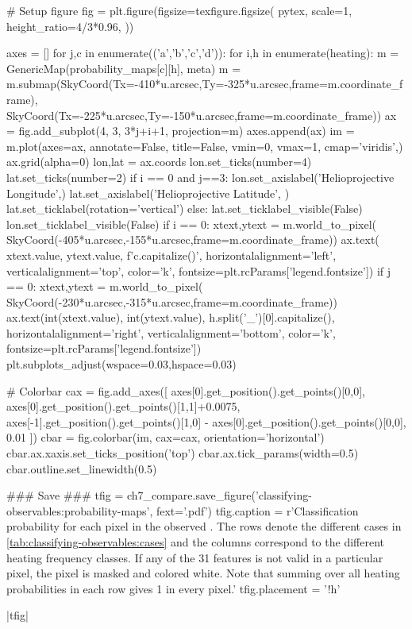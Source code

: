 \begin{pycode}
# Setup figure
fig = plt.figure(figsize=texfigure.figsize(
    pytex,
    scale=1,
    height_ratio=4/3*0.96,
))

axes = []
for j,c in enumerate(('a','b','c','d')):
    for i,h in enumerate(heating):
        m = GenericMap(probability_maps[c][h], meta)
        m = m.submap(SkyCoord(Tx=-410*u.arcsec,Ty=-325*u.arcsec,frame=m.coordinate_frame),
                     SkyCoord(Tx=-225*u.arcsec,Ty=-150*u.arcsec,frame=m.coordinate_frame))
        ax = fig.add_subplot(4, 3, 3*j+i+1, projection=m)
        axes.append(ax)
        im = m.plot(axes=ax, annotate=False, title=False, vmin=0, vmax=1, cmap='viridis',)
        ax.grid(alpha=0)
        lon,lat = ax.coords
        lon.set_ticks(number=4)
        lat.set_ticks(number=2)
        if i == 0 and j==3:
            lon.set_axislabel('Helioprojective Longitude',)
            lat.set_axislabel('Helioprojective Latitude', )
            lat.set_ticklabel(rotation='vertical')
        else:
            lat.set_ticklabel_visible(False)
            lon.set_ticklabel_visible(False)
        if i == 0:
            xtext,ytext = m.world_to_pixel(
                SkyCoord(-405*u.arcsec,-155*u.arcsec,frame=m.coordinate_frame))
            ax.text(
                xtext.value, ytext.value,
                f'{c.capitalize()}',
                horizontalalignment='left',
                verticalalignment='top',
                color='k', fontsize=plt.rcParams['legend.fontsize'])
        if j == 0:
            xtext,ytext = m.world_to_pixel(
                SkyCoord(-230*u.arcsec,-315*u.arcsec,frame=m.coordinate_frame))
            ax.text(int(xtext.value), int(ytext.value),
                    h.split('_')[0].capitalize(),
                    horizontalalignment='right',
                    verticalalignment='bottom',
                    color='k', fontsize=plt.rcParams['legend.fontsize'])
plt.subplots_adjust(wspace=0.03,hspace=0.03)

# Colorbar
cax = fig.add_axes([
    axes[0].get_position().get_points()[0,0],
    axes[0].get_position().get_points()[1,1]+0.0075,
    axes[-1].get_position().get_points()[1,0] - axes[0].get_position().get_points()[0,0],
    0.01
])
cbar = fig.colorbar(im, cax=cax, orientation='horizontal')
cbar.ax.xaxis.set_ticks_position('top')
cbar.ax.tick_params(width=0.5)
cbar.outline.set_linewidth(0.5)

### Save ###
tfig = ch7_compare.save_figure('classifying-observables:probability-maps', fext='.pdf')
tfig.caption = r'Classification probability for each pixel in the observed \AR{}. The rows denote the different cases in \autoref{tab:classifying-observables:cases} and the columns correspond to the different heating frequency classes. If any of the 31 features is not valid in a particular pixel, the pixel is masked and colored white. Note that summing over all heating probabilities in each row gives 1 in every pixel.'
tfig.placement = '!h'
\end{pycode}
|tfig|

